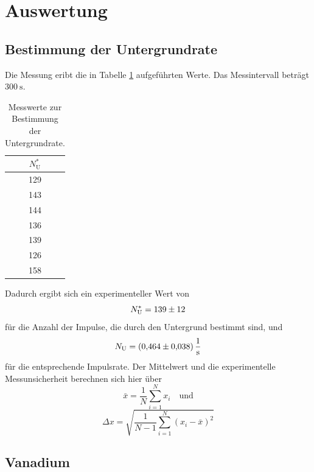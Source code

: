 \section{Auswertung}
\label{sec:Auswertung}

\subsection{Bestimmung der Untergrundrate}

Die Messung eribt die in Tabelle \ref{tab:Untergrundrate} aufgeführten Werte. Das Messintervall beträgt $\SI{300}{\second}$. 
\begin{table}
    \centering
    \caption{Messwerte zur Bestimmung der Untergrundrate.}
    \label{tab:Untergrundrate}
    \begin{tabular}{c}
        \toprule
        $N^*_\text{U}$ \\
        \midrule
        129 \\
        143 \\
        144 \\
        136 \\
        139 \\ 
        126 \\
        158 \\
        \bottomrule
    \end{tabular}
\end{table}
Dadurch ergibt sich ein experimenteller Wert von 
\begin{equation*}
    N^*_\text{U}=\num{139+-12}
\end{equation*}
für die Anzahl der Impulse, die durch den Untergrund bestimmt sind, und 
\begin{equation}
    N_\text{U}=\SI{0.464+-0.038}{\per\second}
    \label{eqn:Untergrund}
\end{equation}
für die entsprechende Impulsrate.
Der Mittelwert und die experimentelle Messunsicherheit berechnen sich hier über 
\begin{equation*}
    \bar{x}=\frac{1}{N}\sum_{i=1}^N x_i \quad \text{und}
\end{equation*}
\begin{equation*}
    \Delta x = \sqrt{\frac{1}{N-1} \sum_{i=1}^N (x_i-\bar{x})^2}
\end{equation*}

\subsection{Vanadium}


